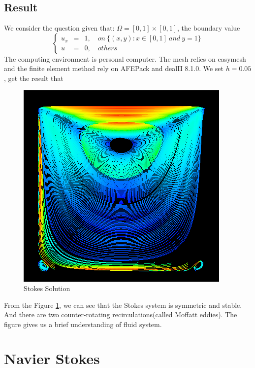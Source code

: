 \documentclass[a4paper]{article}
\begin{document}
\subsection{Result}
We consider the question given that: $\Omega = [0,1]\times[0,1]$, the boundary value
\begin{equation}
\left\lbrace
\begin{array}{rcl}
u_x &=& 1,\quad on \ \{(x,y): x \in [0,1] \ and \ y = 1\}\\
u &=& 0,\quad others
\end{array}
\right.
\label{bd::value1}
\end{equation}
The computing environment is personal computer. The mesh relies on easymesh and the finite element method rely on AFEPack and dealII 8.1.0. We set $h=0.05$, get the result that

\begin{figure}[h]
\centering
\includegraphics[scale = 0.4]{Stokes.png}
\caption{Stokes Solution}
\label{im::Stokes-Solution}
\end{figure}

From the Figure \ref{im::Stokes-Solution}, we can see that the Stokes system is symmetric and stable. And there are two counter-rotating recirculations(called Moffatt eddies). The figure gives us a brief understanding of fluid system.


\section{Navier Stokes}
\end{document}
